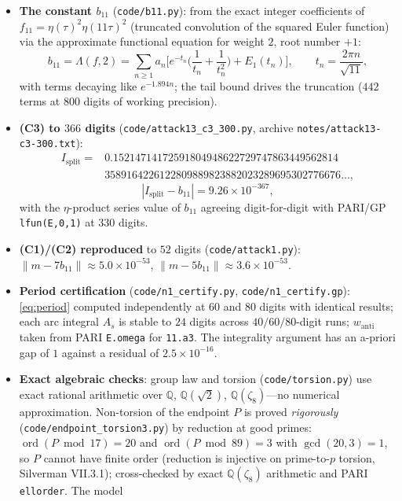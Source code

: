 \documentclass[preprint,12pt]{elsarticle}
\theoremstyle{definition}
\theoremstyle{remark}
\newcommand{\Q}{\mathbb{Q}}
\begin{document}
\begin{itemize}
  \item \textbf{The constant $b_{11}$} (\texttt{code/b11.py}): from the exact
  integer coefficients of $f_{11}=\eta(\tau)^2\eta(11\tau)^2$ (truncated
  convolution of the squared Euler function) via the approximate functional
  equation for weight $2$, root number $+1$:
  \[
    b_{11}=\Lambda(f,2)=\sum_{n\ge1}a_n\Big[e^{-t_n}\Big(\frac1{t_n}
    +\frac1{t_n^2}\Big)+E_1(t_n)\Big],\qquad t_n=\frac{2\pi n}{\sqrt{11}},
  \]
  with terms decaying like $e^{-1.894n}$; the tail bound drives the
  truncation ($442$ terms at $800$ digits of working precision).
  \item \textbf{(C3) to $366$ digits} (\texttt{code/attack13\_c3\_300.py},
  archive \texttt{notes/attack13-c3-300.txt}):
  {\small
  \[
  \begin{aligned}
    I_{\mathrm{split}}
    ={}&0.15214714172591804948622729747863449562814\\
       &3589164226122809889823882023289695302776676\ldots,
  \end{aligned}
  \]}
  \[
    |I_{\mathrm{split}}-b_{11}|=9.26\times10^{-367},
  \]
  with the $\eta$-product series value of $b_{11}$ agreeing digit-for-digit
  with PARI/GP \texttt{lfun(E,0,1)} at $330$ digits.
  \item \textbf{(C1)/(C2) reproduced} to $52$ digits
  (\texttt{code/attack1.py}): $\|m-7b_{11}\|\approx5.0\times10^{-53}$,
  $\|m-5b_{11}\|\approx3.6\times10^{-53}$.
  \item \textbf{Period certification} (\texttt{code/n1\_certify.py},
  \texttt{code/n1\_certify.gp}): \eqref{eq:period} computed independently at
  $60$ and $80$ digits with identical results; each arc integral $A_s$ is
  stable to $24$ digits across $40/60/80$-digit runs; $w_{\mathrm{anti}}$
  taken from PARI \texttt{E.omega} for \texttt{11.a3}. The integrality
  argument has an a-priori gap of $1$ against a residual of
  $2.5\times10^{-16}$.
  \item \textbf{Exact algebraic checks}: group law and torsion
  (\texttt{code/torsion.py}) use exact
  rational arithmetic over $\Q$, $\Q(\sqrt2)$, $\Q(\zeta_8)$---no numerical
  approximation. Non-torsion of the endpoint $P$ is proved \emph{rigorously}
  (\texttt{code/endpoint\_torsion3.py}) by reduction at good primes:
  $\operatorname{ord}(P\bmod 17)=20$ and $\operatorname{ord}(P\bmod 89)=3$
  with $\gcd(20,3)=1$, so $P$ cannot have finite order (reduction is
  injective on prime-to-$p$ torsion, Silverman VII.3.1); cross-checked by
  exact $\Q(\zeta_8)$ arithmetic and PARI \texttt{ellorder}. The model

\end{itemize}
\end{document}
